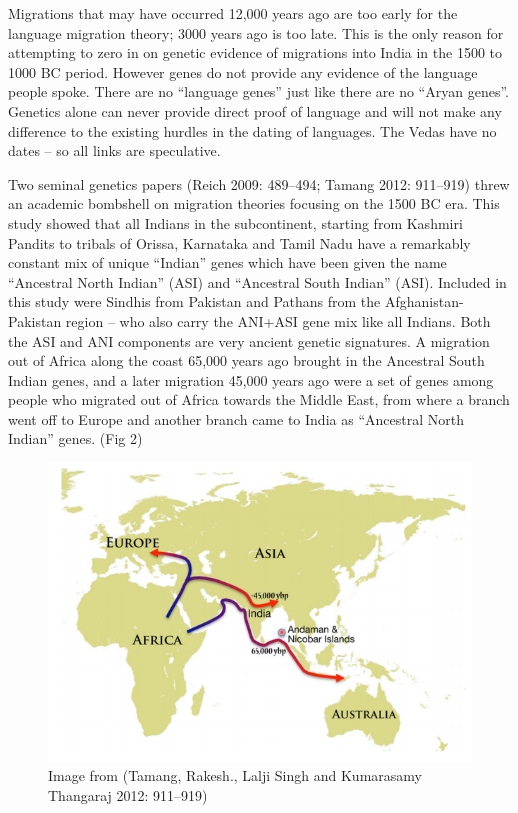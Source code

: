 Migrations that may have occurred 12,000 years ago are too early for the language migration theory; 3000 years ago is too late. This is the only reason for attempting to zero in on genetic evidence of migrations into India in the 1500 to 1000 BC period. However genes do not provide any evidence of the language people spoke. There are no “language genes” just like there are no “Aryan genes”. Genetics alone can never provide direct proof of language and will not make any difference to the existing hurdles in the dating of languages. The Vedas have no dates – so all links are speculative.

Two seminal genetics papers (Reich 2009: 489–494; Tamang 2012: 911–919) threw an academic bombshell on migration theories focusing on the 1500 BC era. This study showed that all Indians in the subcontinent, starting from Kashmiri Pandits to tribals of Orissa, Karnataka and Tamil Nadu have a remarkably constant mix of unique “Indian” genes which have been given the name “Ancestral North Indian” (ASI) and “Ancestral South Indian” (ASI). Included in this study were Sindhis from Pakistan and Pathans from the Afghanistan-Pakistan region – who also carry the ANI+ASI gene mix like all Indians. Both the ASI and ANI components are very ancient genetic signatures. A migration out of Africa along the coast 65,000 years ago brought in the Ancestral South Indian genes, and a later migration 45,000 years ago were a set of genes among people who migrated out of Africa towards the Middle East, from where a branch went off to Europe and another branch came to India as “Ancestral North Indian” genes. (Fig 2)

\begin{figure}[!htbp]
\includegraphics[scale=1.2]{"images/7-02.jpg"}
\caption{Image from (Tamang, Rakesh., Lalji Singh and Kumarasamy Thangaraj 2012: 911–919)}\label{art7-fig02}
\end{figure}

